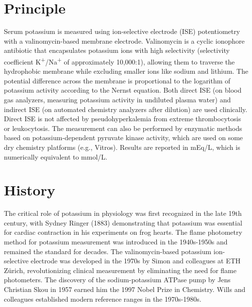 \section*{Principle}
Serum potassium is measured using ion-selective electrode (ISE) potentiometry with a valinomycin-based membrane electrode. Valinomycin is a cyclic ionophore antibiotic that encapsulates potassium ions with high selectivity (selectivity coefficient K\textsuperscript{+}/Na\textsuperscript{+} of approximately 10,000:1), allowing them to traverse the hydrophobic membrane while excluding smaller ions like sodium and lithium. The potential difference across the membrane is proportional to the logarithm of potassium activity according to the Nernst equation. Both direct ISE (on blood gas analyzers, measuring potassium activity in undiluted plasma water) and indirect ISE (on automated chemistry analyzers after dilution) are used clinically. Direct ISE is not affected by pseudohyperkalemia from extreme thrombocytosis or leukocytosis. The measurement can also be performed by enzymatic methods based on potassium-dependent pyruvate kinase activity, which are used on some dry chemistry platforms (e.g., Vitros). Results are reported in mEq/L, which is numerically equivalent to mmol/L.

\section*{History}
The critical role of potassium in physiology was first recognized in the late 19th century, with Sydney Ringer (1883) demonstrating that potassium was essential for cardiac contraction in his experiments on frog hearts. The flame photometry method for potassium measurement was introduced in the 1940s-1950s and remained the standard for decades. The valinomycin-based potassium ion-selective electrode was developed in the 1970s by Simon and colleagues at ETH Z\"{u}rich, revolutionizing clinical measurement by eliminating the need for flame photometers. The discovery of the sodium-potassium ATPase pump by Jens Christian Skou in 1957 earned him the 1997 Nobel Prize in Chemistry. Wills and colleagues established modern reference ranges in the 1970s-1980s.

